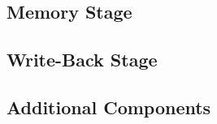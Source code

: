 \subsection{Memory Stage}
    

\subsection{Write-Back Stage}
    

\subsection{Additional Components}
    

